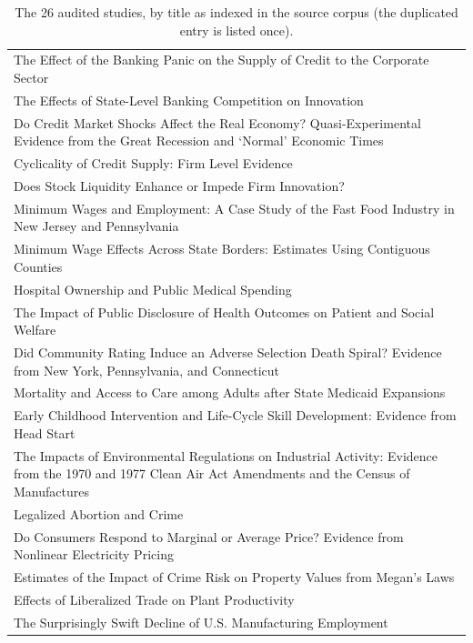 \begin{table}[t]
  \centering\scriptsize
  \caption{The 26 audited studies, by title as indexed in the source corpus
  (the duplicated entry is listed once).}
  \label{tab:corpuslist}
  \setlength{\tabcolsep}{3pt}
  \begin{tabular}{p{}}
    \toprule
    The Effect of the Banking Panic on the Supply of Credit to the Corporate Sector \\
    The Effects of State-Level Banking Competition on Innovation \\
    Do Credit Market Shocks Affect the Real Economy? Quasi-Experimental Evidence from the Great Recession and `Normal' Economic Times \\
    Cyclicality of Credit Supply: Firm Level Evidence \\
    Does Stock Liquidity Enhance or Impede Firm Innovation? \\
    Minimum Wages and Employment: A Case Study of the Fast Food Industry in New Jersey and Pennsylvania \\
    Minimum Wage Effects Across State Borders: Estimates Using Contiguous Counties \\
    Hospital Ownership and Public Medical Spending \\
    The Impact of Public Disclosure of Health Outcomes on Patient and Social Welfare \\
    Did Community Rating Induce an Adverse Selection Death Spiral? Evidence from New York, Pennsylvania, and Connecticut \\
    Mortality and Access to Care among Adults after State Medicaid Expansions \\
    Early Childhood Intervention and Life-Cycle Skill Development: Evidence from Head Start \\
    The Impacts of Environmental Regulations on Industrial Activity: Evidence from the 1970 and 1977 Clean Air Act Amendments and the Census of Manufactures \\
    Legalized Abortion and Crime \\
    Do Consumers Respond to Marginal or Average Price? Evidence from Nonlinear Electricity Pricing \\
    Estimates of the Impact of Crime Risk on Property Values from Megan's Laws \\
    Effects of Liberalized Trade on Plant Productivity \\
    The Surprisingly Swift Decline of U.S. Manufacturing Employment \\

\end{tabular}
\end{table}

